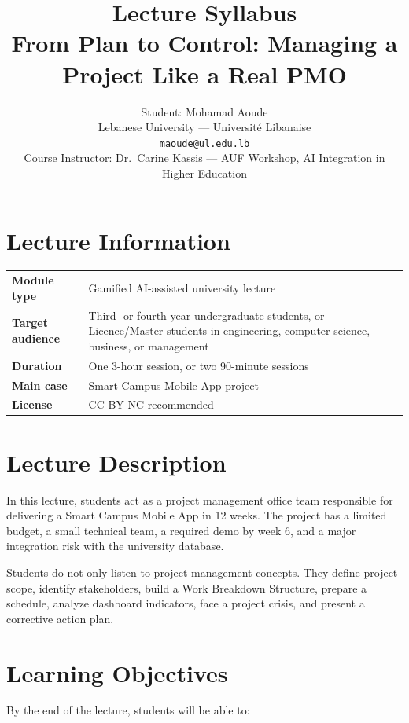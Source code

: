\documentclass[11pt,a4paper]{article}
\title{\textbf{Lecture Syllabus}\\From Plan to Control: Managing a Project Like a Real PMO}
\author{Student: Mohamad Aoude \\ Lebanese University --- Université Libanaise \\ \texttt{maoude@ul.edu.lb} \\ \small Course Instructor: Dr.\ Carine Kassis --- AUF Workshop, AI Integration in Higher Education}
\date{}
\begin{document}
\maketitle

\section*{Lecture Information}

\begin{tabular}{>{\bfseries}p{4cm}p{10.5cm}}
Module type & Gamified AI-assisted university lecture \\
Target audience & Third- or fourth-year undergraduate students, or Licence/Master students in engineering, computer science, business, or management \\
Duration & One 3-hour session, or two 90-minute sessions \\
Main case & Smart Campus Mobile App project \\
License & CC-BY-NC recommended \\
\end{tabular}

\section*{Lecture Description}

In this lecture, students act as a project management office team responsible for delivering a Smart Campus Mobile App in 12 weeks. The project has a limited budget, a small technical team, a required demo by week 6, and a major integration risk with the university database.

Students do not only listen to project management concepts. They define project scope, identify stakeholders, build a Work Breakdown Structure, prepare a schedule, analyze dashboard indicators, face a project crisis, and present a corrective action plan.

\section*{Learning Objectives}

By the end of the lecture, students will be able to:
\end{document}
